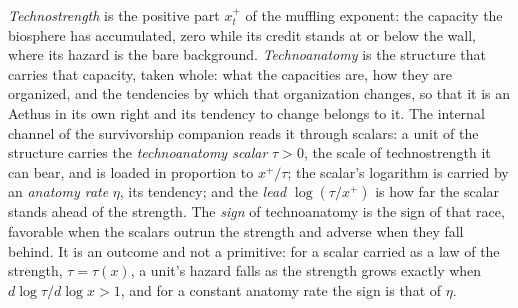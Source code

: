\begin{definition}\label{gr:def:coords}
\emph{Technostrength} is the positive part $x_t^+$ of the muffling
exponent: the capacity the biosphere has accumulated, zero while its
credit stands at or below the wall, where its hazard is the bare
background. \emph{Technoanatomy} is the structure that carries that
capacity, taken whole: what the capacities are, how they are organized,
and the tendencies by which that organization changes, so that it is an
Aethus in its own right and its tendency to change belongs to it. The
internal channel of the survivorship companion
\cite{GoldenSurvivorship} reads it through scalars: a unit of the
structure carries the \emph{technoanatomy scalar} $\tau>0$, the scale of
technostrength it can bear, and is loaded in proportion to $x^+/\tau$;
the scalar's logarithm is carried by an \emph{anatomy rate} $\eta$, its
tendency; and the \emph{lead} $\log(\tau/x^+)$ is how far the scalar
stands ahead of the strength. The \emph{sign} of technoanatomy is the
sign of that race, favorable when the scalars outrun the strength and
adverse when they fall behind. It is an outcome and not a primitive: for
a scalar carried as a law of the strength, $\tau=\tau(x)$, a unit's
hazard falls as the strength grows exactly when $d\log\tau/d\log x>1$,
and for a constant anatomy rate the sign is that of $\eta$.


\end{definition}
